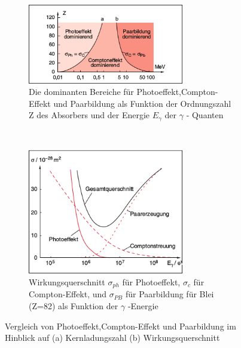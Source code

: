 \documentclass[Ex4_Zusammenfassung.tex]{subfiles}
\begin{document}
	\begin{figure}[h]
	
		\begin{subfigure}{\textwidth}
		\includegraphics[width=6.8cm]{FCP_Z.png}
		\caption{Die dominanten Bereiche für Photoeffekt,Compton-Effekt und Paarbildung als Funktion der Ordnungszahl Z des Absorbers und der Energie $ E_{\gamma} $ der $ \gamma $ - Quanten}
		\end{subfigure}
		\\ \newline
		\begin{subfigure}{\textwidth}
		\includegraphics[width=6.8cm]{FCP_sigma.png}
		\caption{Wirkungsquerschnitt $ \sigma_{ph} $ für Photoeffekt, $ \sigma_{c} $ für Compton-Effekt, und $ \sigma_{PB} $ für Paarbildung für Blei (Z=82) als Funktion der $ \gamma $ -Energie}
		\end{subfigure}
		\caption{Vergleich von Photoeffekt,Compton-Effekt und Paarbildung im Hinblick auf (a) Kernladungszahl (b) Wirkungsquerschnitt}
	
	\end{figure}
\end{document}
